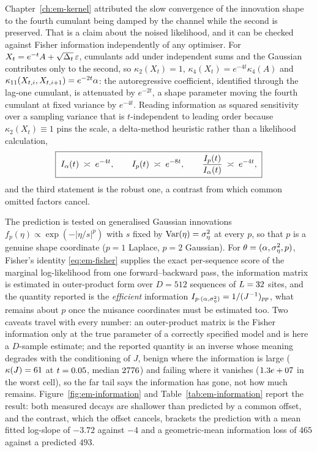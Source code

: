 Chapter~\ref{ch:em-kernel} attributed the slow convergence of the innovation
shape to the fourth cumulant being damped by the channel while the second is
preserved. That is a claim about the noised likelihood, and it can be checked
against Fisher information independently of any optimiser. For
$X_t = e^{-t}A + \sqrt{\Delta_t}\,\varepsilon$, cumulants add under
independent sums and the Gaussian contributes only to the second, so
$\kappa_2(X_t) = 1$, $\kappa_4(X_t) = e^{-4t}\kappa_4(A)$ and
$\kappa_{11}(X_{t,i}, X_{t,i+1}) = e^{-2t}\alpha$: the autoregressive
coefficient, identified through the lag-one cumulant, is attenuated by
$e^{-2t}$, a shape parameter moving the fourth cumulant at fixed variance by
$e^{-4t}$. Reading information as squared sensitivity over a sampling
variance that is $t$-independent to leading order because
$\kappa_2(X_t) \equiv 1$ pins the scale, a delta-method heuristic rather than
a likelihood calculation,
\begin{equation}
  \boxed{\;
  I_{\alpha}(t) \;\asymp\; e^{-4t},
  \qquad
  I_{p}(t) \;\asymp\; e^{-8t},
  \qquad
  \frac{I_{p}(t)}{I_{\alpha}(t)} \;\asymp\; e^{-4t},
  \;}
  \label{eq:em-info-prediction}
\end{equation}
and the third statement is the robust one, a contrast from which common
omitted factors cancel.

The prediction is tested on generalised Gaussian innovations
$f_p(\eta) \propto \exp(-|\eta/s|^p)$ with $s$ fixed by
$\operatorname{Var}(\eta) = \sigma_\eta^2$ at every $p$, so that $p$ is a genuine
shape coordinate ($p = 1$ Laplace, $p = 2$ Gaussian). For
$\theta = (\alpha, \sigma_\eta^2, p)$, Fisher's identity \eqref{eq:em-fisher} supplies
the exact per-sequence score of the marginal log-likelihood from one
forward--backward pass, the information matrix is estimated in outer-product
form over $D = 512$ sequences of $L = 32$ sites, and the quantity
reported is the \emph{efficient} information
$I_{p\cdot(\alpha,\sigma_\eta^2)} = 1/(J^{-1})_{pp}$, what remains about $p$ once the
nuisance coordinates must be estimated too. Two caveats travel with every
number: an outer-product matrix is the Fisher information only at the true
parameter of a correctly specified model and is here a $D$-sample estimate;
and the reported quantity is an inverse whose meaning degrades with the
conditioning of $J$, benign where the information is large
($\kappa(J) = 61$ at $t = 0.05$, median $2776$)
and failing where it vanishes ($1.3e+07$ in the worst cell), so the far
tail says the information has gone, not how much remains.
Figure~\ref{fig:em-information} and Table~\ref{tab:em-information} report
the result: both measured decays are shallower than predicted by a common
offset, and the contrast, which the offset cancels, brackets the prediction
with a mean fitted log-slope of $-3.72$ against $-4$ and a geometric-mean
information loss of $465$ against a predicted $493$.

